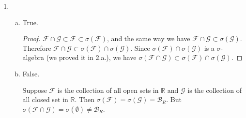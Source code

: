 \documentclass[11pt]{article}
\begin{document}
\begin{enumerate}[1.]
\begin{enumerate}[(a)]
\begin{proof}
            Then $\mathcal{B}_{R^2} = \sigma(\left\{[a,b] \times [c,d] : a\le b\ \&\ c \le d\ \&\ a,b,c,d \in \mathcal{R}\right\})$.
        \end{proof}

    \end{enumerate}
    \item 
    \begin{enumerate}[(a)]
        \item
        True.
        \begin{proof}
            $\mathcal{F} \cap \mathcal{G} \subset \mathcal{F} \subset \sigma(\mathcal{F})$, and the same way we have $\mathcal{F} \cap \mathcal{G} \subset \sigma(\mathcal{G})$.
            Therefore $\mathcal{F} \cap \mathcal{G} \subset \sigma(\mathcal{F}) \cap \sigma(\mathcal{G})$. Since $\sigma(\mathcal{F}) \cap \sigma(\mathcal{G})$ is a $\sigma$-algebra (we proved it in 2.a.), we have $\sigma(\mathcal{F} \cap \mathcal{G}) \subset \sigma(\mathcal{F}) \cap \sigma(\mathcal{G})$.
        \end{proof}
        \item
        False.

        Suppose $\mathcal{F}$ is the collection of all open sets in $\mathbb{R}$ and $\mathcal{G}$ is the collection of all closed set in $\mathbb{R}$.
        Then $\sigma(\mathcal{F}) = \sigma(\mathcal{G}) = \mathcal{B}_R$. But $\sigma(\mathcal{F} \cap \mathcal{G}) = \sigma(\emptyset) \neq \mathcal{B}_R$. 
    \end{enumerate}
\end{enumerate}
\end{document}
